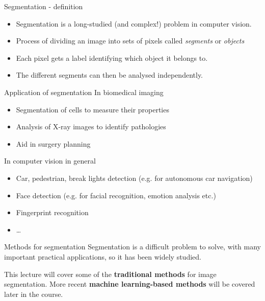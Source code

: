 \documentclass[9pt, aspectratio=169]{beamer}
\begin{document}
\begin{frame}
    {Segmentation - definition}
    \begin{itemize}
        \item Segmentation is a long-studied (and complex!) problem in computer vision.
        \item Process of dividing an image into sets of pixels called \textit{segments} or \textit{objects}
        \item Each pixel gets a label identifying which object it belongs to.
        \item The different segments can then be analysed independently.
    \end{itemize}
\end{frame}

\begin{frame}
    {Application of segmentation}
    In biomedical imaging
    \begin{itemize}
        \item Segmentation of cells to measure their properties
        \item Analysis of X-ray images to identify pathologies
        \item Aid in surgery planning
    \end{itemize}
    \pause
    In computer vision in general
    \begin{itemize}
        \item Car, pedestrian, break lights detection (e.g. for autonomous car navigation)
        \item Face detection (e.g. for facial recognition, emotion analysis etc.)
        \item Fingerprint recognition
        \item \dots
    \end{itemize}
\end{frame}

\begin{frame}
    {Methods for segmentation}
    Segmentation is a difficult problem to solve, with many important practical applications, so it has been widely studied.

    \pause

    This lecture will cover some of the \textbf{traditional methods} for image segmentation. More recent \textbf{machine learning-based methods} will be covered later in the course.
\end{frame}
\end{document}
